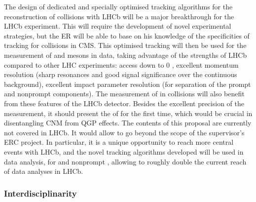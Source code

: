 \documentclass[a4paper,11pt]{article}
\newcommand{\ER}{ER\xspace}
\newcommand{\supervisor}{the supervisor\xspace}
\begin{document}
The design of dedicated and specially optimised tracking algorithms for the reconstruction of \pbpb collisions with LHCb will be a major breakthrough for the LHCb experiment. This will require the development of novel experimental strategies, but the \ER will be able to base on his knowledge of the specificities of tracking for \pbpb collisions in CMS.
%
This optimised tracking will then be used for the measurement of \Dz and \Jpsi mesons in \pbpb data, taking advantage of the strengths of LHCb compared to other LHC experiments: access down to 0 \pt, excellent momentum resolution (sharp resonances and good signal significance over the continuous background), excellent impact parameter resolution (for separation of the prompt and nonprompt components).
%
The measurement of \PgUabc in \ppb collisions will also benefit from these features of the LHCb detector. Besides the excellent precision of the measurement, it should present the \rpa of \PgUc for the first time, which would be crucial in disentangling CNM from QGP effects.
%
The contents of this proposal are currently not covered in LHCb. It would allow to go beyond the scope of \supervisor's ERC project. In particular, it is a unique opportunity to reach more central \pbpb events with LHCb, and the novel tracking algorithms developed will be used in data analysis, for \Dz and nonprompt \Jpsi, allowing to roughly double the current \npart reach of data analyses in LHCb. 
% 
% 

% 

\subsubsection{Interdisciplinarity}
\end{document}
